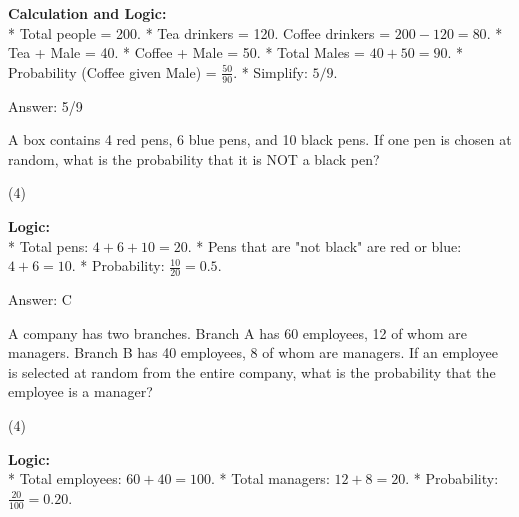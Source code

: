 \documentclass[11pt,paper=a4,answers]{exam}
\begin{document}
\begin{questions}
\begin{solution}
\vspace{30pt}

\textbf{Calculation and Logic:} \\
* Total people = 200.
* Tea drinkers = 120. Coffee drinkers = $200 - 120 = 80$.
* Tea + Male = 40.
* Coffee + Male = 50.
* Total Males = $40 + 50 = 90$.
* Probability (Coffee given Male) = $\frac{50}{90}$.
* Simplify: $5/9$.

\vspace{30pt}

Answer: \colorbox{yellow!100}{5/9}
\end{solution}

\vspace{60pt}

\question
A box contains 4 red pens, 6 blue pens, and 10 black pens. If one pen is chosen at random, what is the probability that it is NOT a black pen?
\begin{tasks}(4)
\end{tasks}

\begin{solution}
\textbf{Logic:} \\
* Total pens: $4 + 6 + 10 = 20$.
* Pens that are "not black" are red or blue: $4 + 6 = 10$.
* Probability: $\frac{10}{20} = 0.5$.

\vspace{30pt}

Answer: \colorbox{yellow!100}{C}
\end{solution}

\vspace{60pt}

\question
A company has two branches. Branch A has 60 employees, 12 of whom are managers. Branch B has 40 employees, 8 of whom are managers. If an employee is selected at random from the entire company, what is the probability that the employee is a manager?
\begin{tasks}(4)
\end{tasks}

\begin{solution}
\textbf{Logic:} \\
* Total employees: $60 + 40 = 100$.
* Total managers: $12 + 8 = 20$.
* Probability: $\frac{20}{100} = 0.20$.


\end{solution}
\end{questions}
\end{document}

